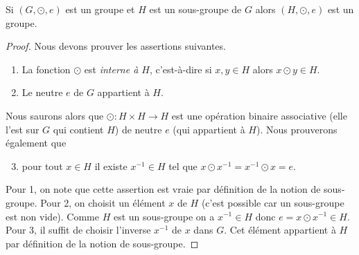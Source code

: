 \documentclass[french,course,oneside,theoremnosection]{lecture}
\begin{document}
\begin{proposition}
Si $(G, \odot, e)$ est un groupe et $H$ est un sous-groupe de $G$ alors $(H, \odot, e)$ est un groupe.
\end{proposition}
\begin{proof}
Nous devons prouver les assertions suivantes.
\begin{enumerate}
\item La fonction $\odot$ est \emph{interne à $H$}, c'est-à-dire si $x, y \in H$ alors $x\odot y \in H$.
\item Le neutre $e$ de $G$ appartient à $H$.
\end{enumerate}
Nous saurons alors que $\odot\colon H \times H \to H$ est une opération binaire associative (elle l'est sur $G$ qui contient $H$) de neutre $e$ (qui appartient à $H$). Nous prouverons également que 
\begin{enumerate}\setcounter{enumi}{2}
\item pour tout $x\in H$ il existe $x^{-1}\in H$ tel que $x\odot x^{-1} = x^{-1} \odot x = e$.
\end{enumerate}

Pour 1, on note que cette assertion est vraie par définition de la notion de sous-groupe. Pour 2, on choisit un élément $x$ de $H$ (c'est possible car un sous-groupe est non vide). Comme $H$ est un sous-groupe on a $x^{-1}\in H$ donc $e=x\odot x^{-1}\in H$. Pour 3, il suffit de choisir l'inverse $x^{-1}$ de $x$ dans $G$. Cet élément appartient à $H$ par définition de la notion de sous-groupe.
\end{proof}
\end{document}
